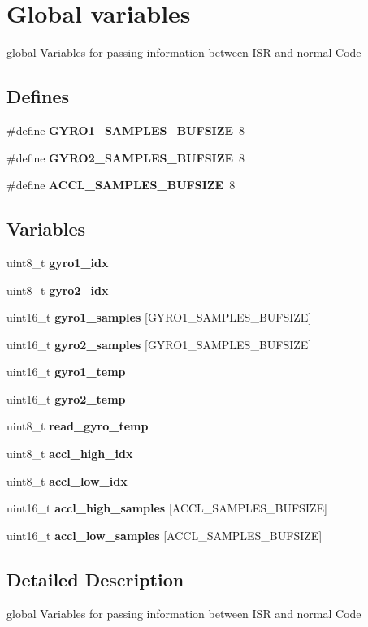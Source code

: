 \section{Global variables}
\label{group__ro__globals}
global Variables for passing information between ISR and normal Code  
\subsection*{Defines}
\begin{CompactItemize}
\item 
\#define {\bf GYRO1\_\-SAMPLES\_\-BUFSIZE}~8
\item 
\#define {\bf GYRO2\_\-SAMPLES\_\-BUFSIZE}~8
\item 
\#define {\bf ACCL\_\-SAMPLES\_\-BUFSIZE}~8
\end{CompactItemize}
\subsection*{Variables}
\begin{CompactItemize}
\item 
uint8\_\-t {\bf gyro1\_\-idx}
\item 
uint8\_\-t {\bf gyro2\_\-idx}
\item 
uint16\_\-t {\bf gyro1\_\-samples} [GYRO1\_\-SAMPLES\_\-BUFSIZE]
\item 
uint16\_\-t {\bf gyro2\_\-samples} [GYRO1\_\-SAMPLES\_\-BUFSIZE]
\item 
uint16\_\-t {\bf gyro1\_\-temp}
\item 
uint16\_\-t {\bf gyro2\_\-temp}
\item 
uint8\_\-t {\bf read\_\-gyro\_\-temp}
\item 
uint8\_\-t {\bf accl\_\-high\_\-idx}
\item 
uint8\_\-t {\bf accl\_\-low\_\-idx}
\item 
uint16\_\-t {\bf accl\_\-high\_\-samples} [ACCL\_\-SAMPLES\_\-BUFSIZE]
\item 
uint16\_\-t {\bf accl\_\-low\_\-samples} [ACCL\_\-SAMPLES\_\-BUFSIZE]
\end{CompactItemize}


\subsection{Detailed Description}
global Variables for passing information between ISR and normal Code 



